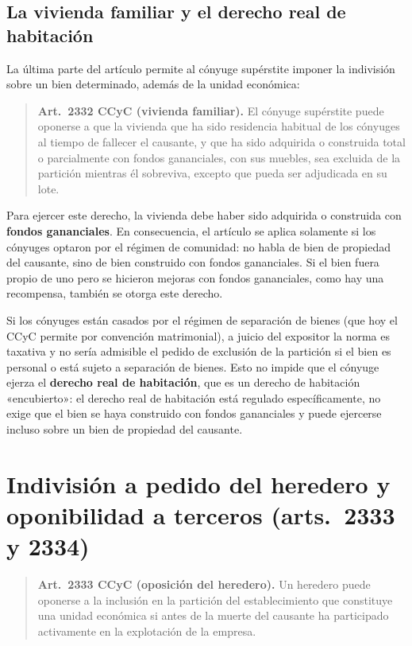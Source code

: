\documentclass[12pt,oneside]{book}
\begin{document}
\subsection{La vivienda familiar y el derecho real de habitación}

La última parte del artículo permite al cónyuge supérstite imponer la indivisión sobre un bien determinado, además de la unidad económica:

\begin{quote}
\textbf{Art.~2332 CCyC (vivienda familiar).} El cónyuge supérstite puede oponerse a que la vivienda que ha sido residencia habitual de los cónyuges al tiempo de fallecer el causante, y que ha sido adquirida o construida total o parcialmente con fondos gananciales, con sus muebles, sea excluida de la partición mientras él sobreviva, excepto que pueda ser adjudicada en su lote.
\end{quote}

Para ejercer este derecho, la vivienda debe haber sido adquirida o construida con \textbf{fondos gananciales}. En consecuencia, el artículo se aplica solamente si los cónyuges optaron por el régimen de comunidad: no habla de bien de propiedad del causante, sino de bien construido con fondos gananciales. Si el bien fuera propio de uno pero se hicieron mejoras con fondos gananciales, como hay una recompensa, también se otorga este derecho.

Si los cónyuges están casados por el régimen de separación de bienes (que hoy el CCyC permite por convención matrimonial), a juicio del expositor la norma es taxativa y no sería admisible el pedido de exclusión de la partición si el bien es personal o está sujeto a separación de bienes. Esto no impide que el cónyuge ejerza el \textbf{derecho real de habitación}, que es un derecho de habitación «encubierto»: el derecho real de habitación está regulado específicamente, no exige que el bien se haya construido con fondos gananciales y puede ejercerse incluso sobre un bien de propiedad del causante.

\section[Indivisión a pedido del heredero y oponibilidad (arts.~2333 y 2334)]{Indivisión a pedido del heredero y oponibilidad a terceros (arts.~2333 y 2334)}

\begin{quote}
\textbf{Art.~2333 CCyC (oposición del heredero).} Un heredero puede oponerse a la inclusión en la partición del establecimiento que constituye una unidad económica si antes de la muerte del causante ha participado activamente en la explotación de la empresa.
\end{quote}
\end{document}
